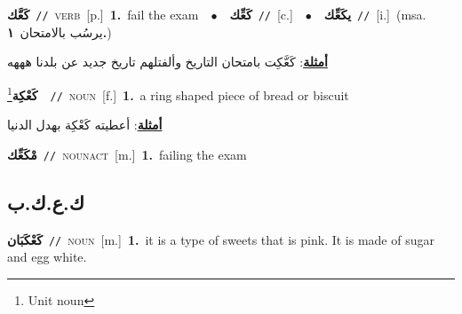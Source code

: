 \documentclass[10pt,a4paper,twoside]{article} %
\begin{document}
\begin{multicols}{2}
{\setlength\topsep{0pt}\textbf{\foreignlanguage{arabic}{كَعَّك}}\ {\color{gray}\texttt{//}\color{black}}\ \textsc{verb}\ [p.]\ \textbf{1.}~fail the exam\ \ $\bullet$\ \ \setlength\topsep{0pt}\textbf{\foreignlanguage{arabic}{كَعِّك}}\ {\color{gray}\texttt{//}\color{black}}\ [c.]\ \ $\bullet$\ \ \setlength\topsep{0pt}\textbf{\foreignlanguage{arabic}{يكَعِّك}}\ {\color{gray}\texttt{//}\color{black}}\ [i.]\ \color{gray}(msa. \foreignlanguage{arabic}{يرسُب بالامتحان}~\foreignlanguage{arabic}{\textbf{١.}})\color{black}\  \begin{flushright}\color{gray}\foreignlanguage{arabic}{\textbf{\underline{\foreignlanguage{arabic}{أمثلة}}}: كَعَّكِت بامتحان التاريخ وألفتلهم تاريخ جديد عن بلدنا هههه}\end{flushright}\color{black}} \vspace{2mm}

{\setlength\topsep{0pt}\textbf{\foreignlanguage{arabic}{كَعْكِة}}\footnote{Unit noun}\ \ {\color{gray}\texttt{//}\color{black}}\ \textsc{noun}\ [f.]\ \textbf{1.}~a ring shaped piece of bread or biscuit\  \begin{flushright}\color{gray}\foreignlanguage{arabic}{\textbf{\underline{\foreignlanguage{arabic}{أمثلة}}}: أعطيته كَعْكِة بهدل الدنيا}\end{flushright}\color{black}} \vspace{2mm}

{\setlength\topsep{0pt}\textbf{\foreignlanguage{arabic}{مْكَعِّك}}\ {\color{gray}\texttt{//}\color{black}}\ \textsc{noun\textunderscore act}\ [m.]\ \textbf{1.}~failing the exam\ } \vspace{2mm}

\vspace{-3mm}
\subsection*{\color{blue}\foreignlanguage{arabic}{ك.ع.ك.ب}\color{blue}{}} 

{\setlength\topsep{0pt}\textbf{\foreignlanguage{arabic}{كَعْكَبَان}}\ {\color{gray}\texttt{//}\color{black}}\ \textsc{noun}\ [m.]\ \textbf{1.}~it is a type of sweets that is pink. It is made of sugar and egg white.\ } \vspace{2mm}


\end{multicols}
\end{document}
